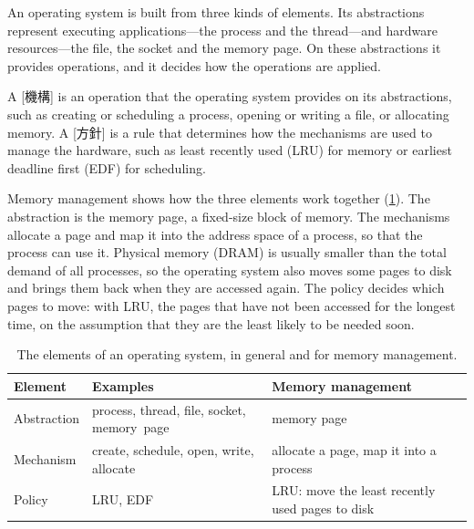 \documentclass[../main.tex]{subfiles}
\begin{document}
An operating system is built from three kinds of
elements.  Its abstractions represent executing applications---the
process and the thread---and hardware resources---the file, the socket and
the memory page.  On these abstractions it provides operations, and it
decides how the operations are applied.

\begin{definition}
  A [機構] is an operation that the operating system
  provides on its abstractions, such as creating or scheduling a process,
  opening or writing a file, or allocating memory.  A
  [方針] is a rule that determines how the mechanisms are
  used to manage the hardware, such as least recently used (LRU) for
  memory or earliest deadline first (EDF) for scheduling.
\end{definition}

Memory management shows how the three elements work together
(\cref{tab:l01-elements}).  The abstraction is the memory page, a
fixed-size block of memory.  The mechanisms allocate a page and map it into
the address space of a process, so that the process can use it.  Physical
memory (DRAM) is usually smaller than the total demand of all processes,
so the operating system also moves some pages to disk and brings them back
when they are accessed again.  The policy decides which pages to
move: with
LRU, the pages that have not been accessed for the longest time, on the
assumption that they are the least likely to be needed soon.


\begin{table}[htbp]
  \centering
  \caption{The elements of an operating system, in general and for memory
    management.}
  \label{tab:l01-elements}
  \small
  \begin{tabular}{@{}l>{\raggedright}p{47mm}>{\raggedright\arraybackslash}p{45mm}@{}}
    \toprule
    Element & Examples & Memory management \\
    \midrule
    Abstraction & process, thread, file, socket, memory~page & memory page \\
    Mechanism & create, schedule, open, write, allocate
      & allocate a page, map it into a process \\
    Policy & LRU, EDF & LRU: move the least recently used pages to disk \\
    \bottomrule
  \end{tabular}
\end{table}
\end{document}
